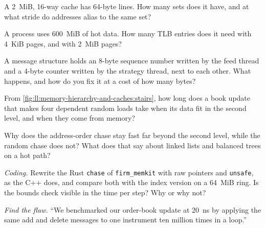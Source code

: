 \begin{exercise}[$\star$]\label{exo:ll:memory-hierarchy-and-caches:2}
A 2~MiB, 16-way cache has 64-byte lines. How many sets does it have, and at what stride do addresses alias to the same
set?
\end{exercise}

\begin{exercise}[$\star$]\label{exo:ll:memory-hierarchy-and-caches:3}
A process uses 600~MiB of hot data. How many TLB entries does it need with 4~KiB pages, and with 2~MiB pages?
\end{exercise}

\begin{exercise}[$\star\star$]\label{exo:ll:memory-hierarchy-and-caches:4}
A message structure holds an 8-byte sequence number written by the feed thread and a 4-byte counter written by the
strategy thread, next to each other. What happens, and how do you fix it at a cost of how many bytes?
\end{exercise}

\begin{exercise}[$\star\star$]\label{exo:ll:memory-hierarchy-and-caches:5}
From \cref{fig:ll:memory-hierarchy-and-caches:stairs}, how long does a book update that makes four dependent random
loads take when its data fit in the second level, and when they come from memory?
\end{exercise}

\begin{exercise}[$\star\star$]\label{exo:ll:memory-hierarchy-and-caches:6}
Why does the address-order chase stay fast far beyond the second level, while the random chase does not? What does that
say about linked lists and balanced trees on a hot path?
\end{exercise}

\begin{exercise}[$\star\star\star$]\label{exo:ll:memory-hierarchy-and-caches:7}
\emph{Coding.} Rewrite the Rust \texttt{chase} of \texttt{firm\_memkit} with raw pointers and \texttt{unsafe}, as the C++
does, and compare both with the index version on a 64~MiB ring. Is the bounds check visible in the time per step? Why or
why not?
\end{exercise}

\begin{exercise}[$\star\star\star$]\label{exo:ll:memory-hierarchy-and-caches:8}
\emph{Find the flaw.} ``We benchmarked our order-book update at \qty{20}{\nano\second} by applying the same add and
delete messages to one instrument ten million times in a loop.''
\end{exercise}

